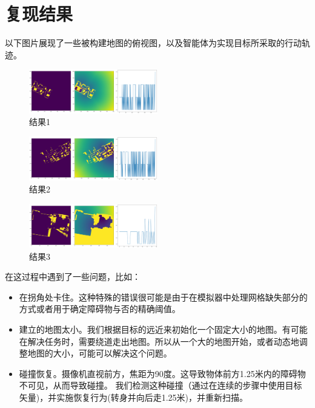 \documentclass{thuemp}
\begin{document}
\section{复现结果}
以下图片展现了一些被构建地图的俯视图，以及智能体为实现目标所采取的行动轨迹。
\begin{figure}[h]
  \centering
  \includegraphics[width=0.5\textwidth]{image/8.png}
  \caption{结果1}
\end{figure}
\begin{figure}[h]
  \centering
  \includegraphics[width=0.5\textwidth]{image/9.png}
  \caption{结果2}
\end{figure}
\begin{figure}[h]
  \centering
  \includegraphics[width=0.5\textwidth]{image/10.png}
  \caption{结果3}
\end{figure}

在这过程中遇到了一些问题，比如：
\begin{itemize}
  \item 在拐角处卡住。这种特殊的错误很可能是由于在模拟器中处理网格缺失部分的方式或者用于确定障碍物与否的精确阈值。
  \item 建立的地图太小。我们根据目标的远近来初始化一个固定大小的地图。有可能在解决任务时，需要绕道走出地图。所以从一个大的地图开始，或者动态地调整地图的大小，可能可以解决这个问题。
  \item 碰撞恢复。摄像机直视前方，焦距为90度。这导致物体前方1.25米内的障碍物不可见，从而导致碰撞。
  我们检测这种碰撞（通过在连续的步骤中使用目标矢量)，并实施恢复行为(转身并向后走1.25米)，并重新扫描。
\end{itemize}
\end{document}
